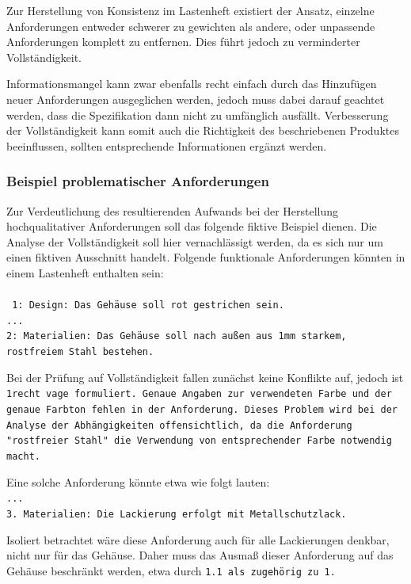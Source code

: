\documentclass[12pt]{report}
\begin{document}
Zur Herstellung von Konsistenz im Lastenheft existiert der Ansatz, einzelne Anforderungen entweder schwerer zu gewichten als andere, oder unpassende Anforderungen komplett zu entfernen. Dies führt jedoch zu verminderter Vollständigkeit. 

Informationsmangel kann zwar ebenfalls recht einfach durch das Hinzufügen neuer Anforderungen ausgeglichen werden, jedoch muss dabei darauf geachtet werden, dass die Spezifikation dann nicht zu umfänglich ausfällt. Verbesserung der Vollständigkeit kann somit auch die Richtigkeit des beschriebenen Produktes beeinflussen, sollten entsprechende Informationen ergänzt werden.

\subsubsection{Beispiel problematischer Anforderungen}
Zur Verdeutlichung des resultierenden Aufwands bei der Herstellung hochqualitativer Anforderungen soll das folgende fiktive Beispiel dienen. Die Analyse der Vollständigkeit soll hier vernachlässigt werden, da es sich nur um einen fiktiven Ausschnitt handelt. Folgende funktionale Anforderungen könnten in einem Lastenheft enthalten sein:
\\
\\ \tt
1: Design: Das Gehäuse soll rot gestrichen sein.\\
...\\
2: Materialien: Das Gehäuse soll nach außen aus 1mm starkem, \\rostfreiem Stahl bestehen.\\
\rm

Bei der Prüfung auf Vollständigkeit fallen zunächst keine Konflikte auf, jedoch ist \tt 1\rm recht vage formuliert. Genaue Angaben zur verwendeten Farbe und der genaue Farbton fehlen in der Anforderung. Dieses Problem wird bei der Analyse der Abhängigkeiten offensichtlich, da die Anforderung "rostfreier Stahl" die Verwendung von entsprechender Farbe notwendig macht. 

Eine solche Anforderung könnte etwa wie folgt lauten:
\\
\tt ...\\
3. Materialien: Die Lackierung erfolgt mit Metallschutzlack.\\
\rm

Isoliert betrachtet wäre diese Anforderung auch für alle Lackierungen denkbar, nicht nur für das Gehäuse. Daher muss das Ausmaß dieser Anforderung auf das Gehäuse beschränkt werden, etwa durch \tt 1.1 \rm als zugehörig zu \tt 1\rm.
\end{document}
